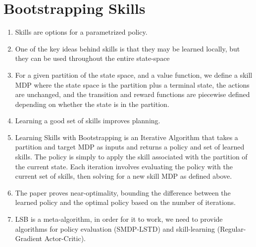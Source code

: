 \documentclass{article}
\begin{document}
\section{Bootstrapping Skills}
\begin{enumerate}
\item Skills are options for a parametrized policy.
\item One of the key ideas behind skills is that they may be learned locally, but they can be used throughout the entire state-space
\item For a given partition of the state space, and a value function, we define a skill MDP where the state space is the partition plus a terminal state, the actions are unchanged, and the transition and reward functions are piecewise defined depending on whether the state is in the partition.
\item Learning a good set of skills improves planning.
\item Learning Skills with Bootstrapping is an Iterative Algorithm that takes a partition and target MDP as inputs and returns a policy and set of learned skills. The policy is simply to apply the skill associated with the partition of the current state. Each iteration involves evaluating the policy with the current set of skills, then solving for a new skill MDP as defined above. 
\item The paper proves near-optimality, bounding the difference between the learned policy and the optimal policy based on the number of iterations.
\item LSB is a meta-algorithm, in order for it to work, we need to provide algorithms for policy evaluation (SMDP-LSTD) and skill-learning (Regular-Gradient Actor-Critic).
\end{enumerate}
\end{document}
